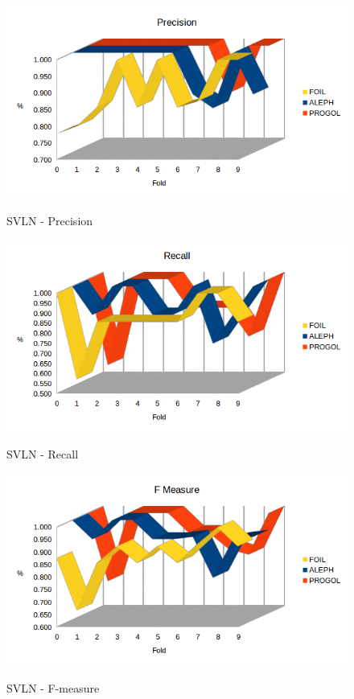 \begin{figure}[H]
	\includegraphics[width=1.1\textwidth]{img/datasetGraph/svln/precision.png}
	\label{svln-Precision}
	\caption{SVLN - Precision}
\end{figure}

\begin{figure}[H]
	\includegraphics[width=1.1\textwidth]{img/datasetGraph/svln/recall.png}
	\label{svln-Recall}
	\caption{SVLN - Recall}
\end{figure}

\begin{figure}[H]
	\includegraphics[width=1.1\textwidth]{img/datasetGraph/svln/fm.png}
	\label{svln-F-measure}
	\caption{SVLN - F-measure}
\end{figure}

